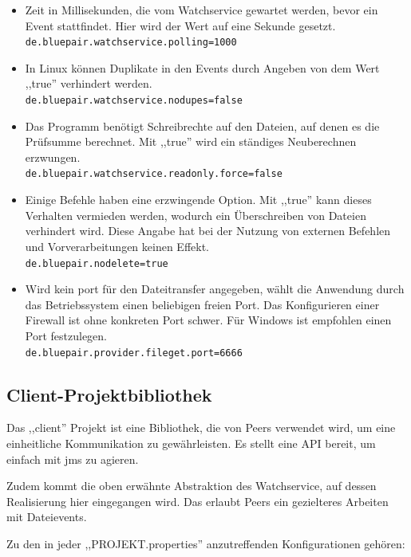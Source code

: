 \documentclass[oneside, ngerman, toc=bibliography,bibliography=totoc,listof=entryprefix, open=right,numbers=noenddot,fontsize=12pt]{scrbook}
\begin{document}
\begin{itemize}
    \item Zeit in Millisekunden, die vom Watchservice gewartet werden, bevor ein Event stattfindet. Hier wird der Wert auf eine Sekunde gesetzt.\\ \verb|de.bluepair.watchservice.polling=1000|

\item In Linux können Duplikate in den Events durch Angeben von dem Wert ,,true'' verhindert werden. \\
\verb|de.bluepair.watchservice.nodupes=false|

\item Das Programm benötigt Schreibrechte auf den Dateien, auf denen es die  Prüfsumme berechnet. Mit ,,true'' wird ein ständiges Neuberechnen erzwungen.\\
\verb|de.bluepair.watchservice.readonly.force=false|

\item Einige Befehle haben eine erzwingende Option.
Mit ,,true'' kann dieses Verhalten vermieden werden, wodurch ein Überschreiben von Dateien verhindert wird. Diese Angabe hat bei der Nutzung von externen Befehlen und Vorverarbeitungen  keinen Effekt.\\
\verb|de.bluepair.nodelete=true|

\item Wird kein port für den Dateitransfer angegeben, wählt die Anwendung durch das Betriebssystem einen beliebigen freien Port. Das Konfigurieren einer Firewall ist ohne konkreten Port schwer. Für Windows ist empfohlen einen Port festzulegen.\\
\verb|de.bluepair.provider.fileget.port=6666|
\end{itemize}

\subsection{Client-Projektbibliothek}

Das ,,client'' Projekt ist eine Bibliothek, die von Peers verwendet wird, um eine einheitliche Kommunikation zu gewährleisten. Es stellt eine API bereit, um einfach mit \acrshort{jms} zu agieren.

Zudem kommt die oben erwähnte Abstraktion des Watchservice, auf dessen Realisierung hier eingegangen wird. Das erlaubt Peers ein gezielteres Arbeiten mit Dateievents.

Zu den in jeder ,,PROJEKT.properties'' anzutreffenden Konfigurationen gehören:
\end{document}

